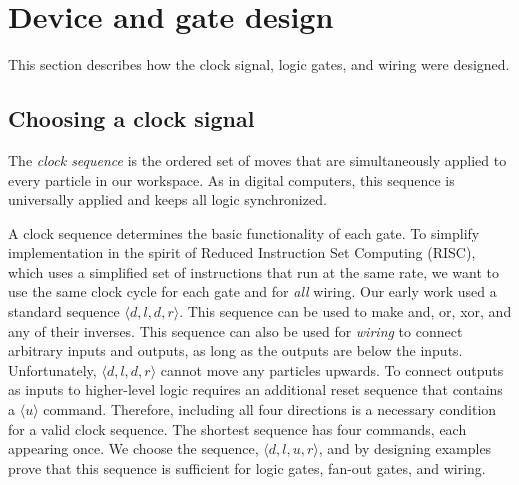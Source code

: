 \documentclass[letterpaper, 10 pt, conference]{ieeeconf}
\begin{document}
\section{Device and gate design}\label{sec:Design}
This section describes how the clock signal, logic gates, and wiring were designed.
\subsection{Choosing a clock signal}

The \emph{clock sequence} is the ordered set of moves that are simultaneously applied to every particle in our workspace. As in digital computers, this sequence is universally applied and keeps all logic synchronized.

A clock sequence determines the basic functionality of each gate.  To simplify implementation in the spirit of Reduced Instruction Set Computing (RISC), which uses a simplified set of instructions that run at the same rate, we want to use the same clock cycle for each gate and for \emph{all} wiring. 
Our early work used a standard sequence  $\langle d,l,d,r \rangle$.  This sequence can be used to make {\sc and, or, xor}, and any of their inverses.  This sequence can also be used for \emph{wiring} to connect arbitrary inputs and outputs, as long as the outputs are below the inputs.  Unfortunately, $\langle d,l,d,r \rangle$ cannot move any particles upwards. To connect outputs as inputs to higher-level logic requires an additional reset sequence that contains a $\langle u \rangle$ command.  Therefore, including all four directions is a necessary condition for a valid clock sequence.  The shortest sequence has four commands, each appearing once. We choose the sequence, $\langle d,l,u,r \rangle$, and by designing examples prove that this sequence is sufficient for logic gates, {\sc fan-out} gates, and wiring.
\end{document}
